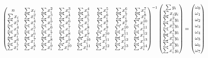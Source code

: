 \documentclass[12pt]{article}%
\begin{document}
\begin{enumerate}
\begin{enumerate}
		\[
		\scalemath{0.75}{
		\begin{pmatrix} n & \sum x_i & \sum x_i^2 & \sum x_i^3 & \sum x_i^4 & \sum x_i^5 & \sum x_i^6 & \sum x_i^7\\ \sum x_i & \sum x_i^2 & \sum x_i^3 & \sum x_i^4 & \sum x_i^5 & \sum x_i^6 & \sum x_i^7 & \sum x_i^8\\ \sum x_i^3 & \sum x_i^4 & \sum x_i^5 & \sum x_i^6 & \sum x_i^7 & \sum x_i^8 & \sum x_i^9 & \sum x_i^{10} \\ \sum x_i^4 & \sum x_i^5 & \sum x_i^6 & \sum x_i^7 & \sum x_i^8 & \sum x_i^9 & \sum x_i^{10} & \sum x_i^{11} \\ \sum x_i^5 & \sum x_i^6 & \sum x_i^7 & \sum x_i^8 & \sum x_i^9 & \sum x_i^{10} & \sum x_i^{11} & \sum x_i^{12} \\ \sum x_i^6 & \sum x_i^7 & \sum x_i^8 & \sum x_i^9 & \sum x_i^{10} & \sum x_i^{11} & \sum x_i^{12} & \sum x_i^{13} \\ \sum x_i^7 & \sum x_i^8 & \sum x_i^9 & \sum x_i^{10} & \sum x_i^{11} & \sum x_i^{12} & \sum x_i^{13} & \sum x_i^{14} \end{pmatrix}^{-1} \begin{pmatrix} \sum y_i\\ \sum x_i y_i\\ \sum x_i^2 y_i\\ \sum x_i^3 y_i\\ \sum x_i^4 y_i\\ \sum x_i^5 y_i\\ \sum x_i^6 y_i\\ \sum x_i^7 y_i \end{pmatrix}  = \begin{pmatrix} \omega_0\\ \omega_1\\ \omega_2\\ \omega_3\\ \omega_4\\ \omega_5\\ \omega_6 \\ \omega_7 \end{pmatrix}}
		\]

		\[

\]
\end{enumerate}
\end{enumerate}
\end{document}

